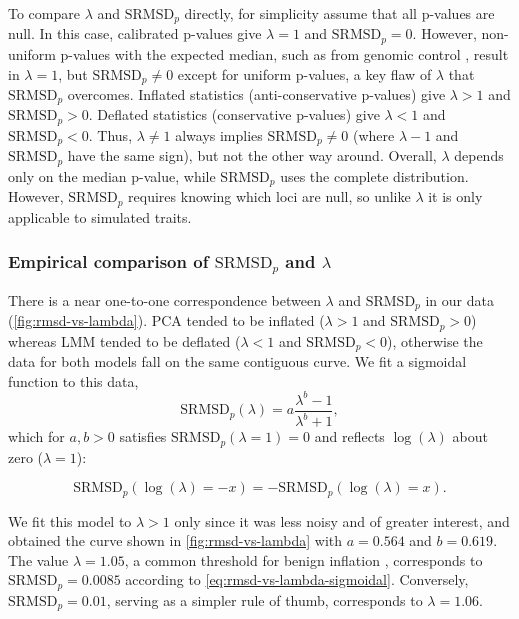 \documentclass[11pt]{article}
\newcommand{\rmsd}{\text{SRMSD}_p}
\begin{document}
\begin{linenumbers}
To compare $\lambda$ and $\rmsd$ directly, for simplicity assume that all p-values are null.
In this case, calibrated p-values give $\lambda = 1$ and $\rmsd = 0$.
However, non-uniform p-values with the expected median, such as from genomic control \citep{devlin_genomic_1999}, result in $\lambda = 1$, but $\rmsd \ne 0$ except for uniform p-values, a key flaw of $\lambda$ that $\rmsd$ overcomes.
Inflated statistics (anti-conservative p-values) give $\lambda > 1$ and $\rmsd > 0$.
Deflated statistics (conservative p-values) give $\lambda < 1$ and $\rmsd < 0$.
Thus, $\lambda \ne 1$ always implies $\rmsd \ne 0$ (where $\lambda - 1$ and $\rmsd$ have the same sign), but not the other way around.
Overall, $\lambda$ depends only on the median p-value, while $\rmsd$ uses the complete distribution.
However, $\rmsd$ requires knowing which loci are null, so unlike $\lambda$ it is only applicable to simulated traits.

\subsubsection{Empirical comparison of $\rmsd$ and $\lambda$}

There is a near one-to-one correspondence between $\lambda$ and $\rmsd$ in our data (\cref{fig:rmsd-vs-lambda}).
PCA tended to be inflated ($\lambda > 1$ and $\rmsd > 0$) whereas LMM tended to be deflated ($\lambda < 1$ and $\rmsd < 0$), otherwise the data for both models fall on the same contiguous curve.
We fit a sigmoidal function to this data,
\begin{equation}
  \label{eq:rmsd-vs-lambda-sigmoidal}
  \rmsd( \lambda ) = a \frac{ \lambda^b - 1 }{ \lambda^b + 1 },
\end{equation}
which for $a,b > 0$ satisfies $\rmsd( \lambda = 1 ) = 0$ and reflects $\log( \lambda )$ about zero ($\lambda = 1$):
\begin{linenomath*}
$$
\rmsd( \log( \lambda ) = -x ) = - \rmsd( \log( \lambda ) = x ).
$$
\end{linenomath*}
We fit this model to $\lambda > 1$ only since it was less noisy and of greater interest, and obtained the curve shown in \cref{fig:rmsd-vs-lambda} with $a = 0.564$ and $b = 0.619$.
The value $\lambda = 1.05$, a common threshold for benign inflation \citep{price_new_2010}, corresponds to $\rmsd = 0.0085$ according to \cref{eq:rmsd-vs-lambda-sigmoidal}.
Conversely, $\rmsd = 0.01$, serving as a simpler rule of thumb, corresponds to $\lambda = 1.06$.


\end{linenumbers}
\end{document}
